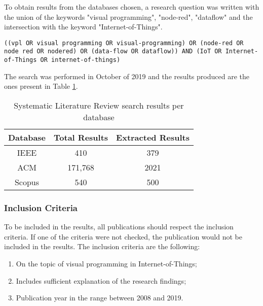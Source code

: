 To obtain results from the databases chosen, a research question was written with the union of the keywords "visual programming", "node-red", "dataflow" and the intersection with the keyword "Internet-of-Things".

\noindent
\begin{lstlisting}[frame=none, numbers=none, backgroundcolor=\color{white},]
((vpl OR visual programming OR visual-programming) OR (node-red OR node red OR nodered) OR (data-flow OR dataflow)) AND (IoT OR Internet-of-Things OR internet-of-things)
\end{lstlisting}

The search was performed in October of 2019 and the results produced are the ones present in Table \ref{tab:slr_search_results}.

\captionsetup{belowskip=12pt,aboveskip=4pt}
\begin{table}[ht]
    \centering
    \begin{tabular}{ c  c  c }
        \toprule
        \textbf{Database} & \textbf{Total Results} & \textbf{Extracted Results}\\
        \midrule
        IEEE & 410 & 379 \\
        ACM & 171,768 & 2021 \\
        Scopus & 540 & 500 \\
        \bottomrule
    \end{tabular}
    \caption{Systematic Literature Review search results per database}
    \label{tab:slr_search_results}
\end{table}{}

\subsubsection{Inclusion Criteria}\label{sec:inclusion}

To be included in the results, all publications should respect the inclusion criteria. If one of the criteria were not checked, the publication would not be included in the results. The inclusion criteria are the following:

\begin{enumerate}
    \item On the topic of visual programming in Internet-of-Things;
    \item Includes sufficient explanation of the research findings;
    \item Publication year in the range between 2008 and 2019.
\end{enumerate}{}

